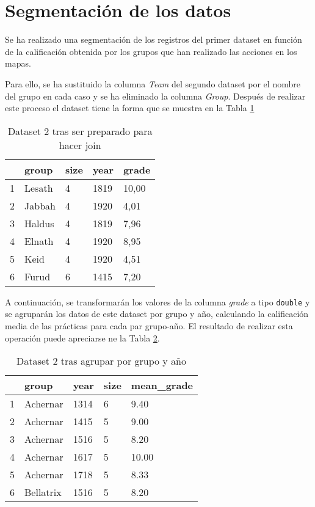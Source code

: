 \documentclass[10pt,a4paper]{article}
\begin{document}
\section{Segmentación de los datos}

Se ha realizado una segmentación de los registros del primer dataset en función de la calificación obtenida por los grupos que han realizado las acciones en los mapas.

Para ello, se ha sustituido la columna \emph{Team} del segundo dataset por el nombre del grupo en cada caso y se ha eliminado la columna \emph{Group}. Después de realizar este proceso el dataset tiene la forma que se muestra en la Tabla \ref{table:8}

\begin{table}[ht]
\centering
\begin{tabular}{rllll}
  \hline
 & group & size & year & grade \\ 
  \hline
1 & Lesath & 4 & 1819 & 10,00 \\ 
  2 & Jabbah & 4 & 1920 & 4,01 \\ 
  3 & Haldus & 4 & 1819 & 7,96 \\ 
  4 & Elnath & 4 & 1920 & 8,95 \\ 
  5 & Keid & 4 & 1920 & 4,51 \\ 
  6 & Furud & 6 & 1415 & 7,20 \\ 
   \hline
\end{tabular}
\caption{Dataset 2 tras ser preparado para hacer join}
\label{table:8}
\end{table}

A continuación, se transformarán los valores de la columna \emph{grade} a tipo \texttt{double} y se agruparán los datos de este dataset por grupo y año, calculando la calificación media de las prácticas para cada par grupo-año. El resultado de realizar esta operación puede apreciarse ne la Tabla \ref{table:9}.

\begin{table}[ht]
\centering
\begin{tabular}{rllll}
  \hline
 & group & year & size & mean\_grade \\ 
  \hline
1 & Achernar & 1314 & 6 &  9.40 \\ 
  2 & Achernar & 1415 & 5 &  9.00 \\ 
  3 & Achernar & 1516 & 5 &  8.20 \\ 
  4 & Achernar & 1617 & 5 & 10.00 \\ 
  5 & Achernar & 1718 & 5 &  8.33 \\ 
  6 & Bellatrix & 1516 & 5 &  8.20 \\ 
   \hline
\end{tabular}
\caption{Dataset 2 tras agrupar por grupo y año}
\label{table:9}
\end{table}
\end{document}

